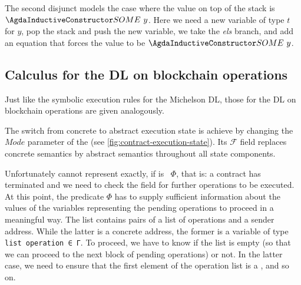 The second disjunct models the case where the value on top of the stack is
$\ACon{SOME}~y$. Here we need a new variable of type $t$ for $y$, pop
the stack and push the new variable, we take the \emph{els} branch,
and add an equation that forces the value to be $\ACon{SOME}~y$.

\subsection{Calculus for the DL on blockchain operations}
\label{sec:calc-dl-blockch}

Just like the symbolic execution rules for the Michelson DL,
those for the DL on blockchain operations
are given analogously.
\AbstractUExecState
\AbstractAexecStep






The switch from concrete to abstract execution state is achieve by
changing the $Mode$ parameter of the  (see
\autoref{fig:contract-execution-state}). Its $\mathcal{F}$ field
replaces concrete semantics by abstract semantics throughout all state
components. 


Unfortunately  cannot represent 
exactly, if  is ~$\Phi$, that is: a
contract has terminated and we need to check the 
field for further operations to be executed. 
At this point, the predicate $\Phi$ has to supply sufficient information about the values of the variables
representing the pending operations to proceed in a meaningful way.
The  list contains pairs of a list of operations and a
sender address. While the latter is a concrete address, the former is
a variable of type \verb/list operation ∈ Γ/. To proceed, we have to
know if the list  is empty (so that we can proceed to the next block
of pending operations) or not. In the latter case, we need to ensure
that the first element of the operation list is a
, and so on.

